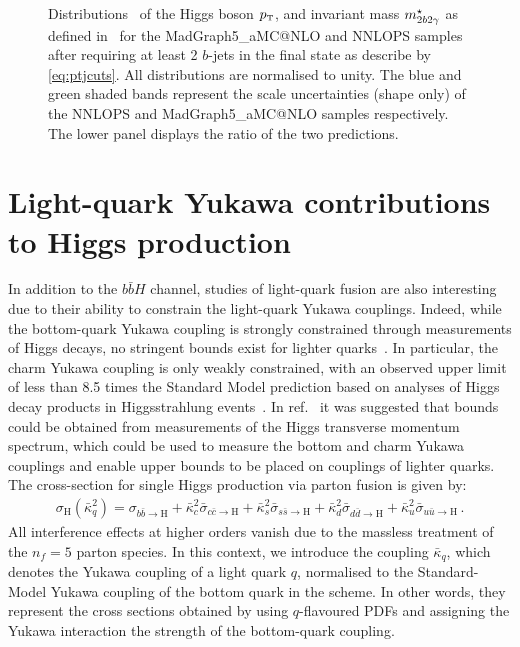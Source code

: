 \documentclass[11pt,a4paper]{article}
\begin{document}
\begin{figure}[t!]
\begin{center}
\begin{tabular}{cc}
\end{tabular}
\vspace*{1ex}
\caption{Distributions~ of the Higgs boson $\pt$, and invariant mass $m_{2b2\gamma}^{\star}$ as defined in~  for the {\sc MadGraph5\_aMC@NLO} and {\sc NNLOPS} samples after requiring at least 2 $b$-jets in the final state as describe by \eqref{eq:ptjcuts}. All distributions are normalised to unity. The blue and green shaded bands represent the scale uncertainties (shape only) of the {\sc NNLOPS} and {\sc MadGraph5\_aMC@NLO} samples respectively. The lower panel displays the ratio of the two predictions.\label{fig:4fsNNLOPS}}
\end{center}
\end{figure}




\section{Light-quark Yukawa contributions to Higgs production}\label{sec:lightYukawa}
In addition to the $b\bar{b}H$ channel, studies of light-quark fusion are also interesting due to their ability to constrain the light-quark Yukawa couplings. Indeed, while the bottom-quark Yukawa coupling is strongly constrained through measurements of Higgs decays, no stringent bounds exist for lighter quarks~\cite{Kagan:2014ila}. In particular, the charm Yukawa coupling is only weakly constrained, with an observed upper limit of less than 8.5 times the Standard Model prediction based on analyses of Higgs decay products in Higgsstrahlung events~\cite{Atlas:2022ers}. In ref.~\cite{Bishara:2016jga} it was suggested that bounds could be obtained from measurements of the Higgs transverse momentum spectrum, which could be used to measure the bottom and charm Yukawa couplings and  enable upper bounds to be placed on couplings of lighter quarks. The cross-section for single Higgs production via parton fusion is given by:
\begin{align}
\sigma_{\text{H}}(\bar \kappa_q^2)=\sigma_{b\bar b \rightarrow \text{H}}+\bar \kappa_c^2 \bar \sigma_{c\bar c \rightarrow \text{H}}+\bar \kappa_s^2 \bar \sigma_{s\bar s \rightarrow \text{H}}+\bar \kappa_d^2 \bar \sigma_{d\bar d \rightarrow \text{H}}+\bar \kappa_u^2 \bar \sigma_{u\bar u \rightarrow \text{H}}\,.
\end{align}
All interference effects at higher orders vanish due to the massless treatment of the \( n_f = 5 \) parton species. In this context, we introduce the coupling \( \bar\kappa_q \), which denotes the Yukawa coupling of a light quark \( q \), normalised to the Standard-Model Yukawa coupling of the bottom quark in the \MSbar{} scheme. In other words, they represent the cross sections obtained by using \( q \)-flavoured PDFs and assigning the Yukawa interaction the strength of the bottom-quark coupling.
\end{document}
